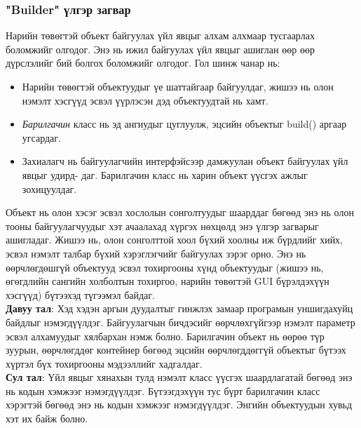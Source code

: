 \subsubsection{"Builder" үлгэр загвар}
\quad \quad Нарийн төвөгтэй объект байгуулах үйл явцыг алхам алхмаар тусгаарлах боломжийг олгодог. Энэ нь ижил байгуулах үйл явцыг ашиглан өөр өөр дүрслэлийг бий болгох боломжийг олгодог. Гол шинж чанар нь:
\begin{itemize}
	\item Нарийн төвөгтэй объектуудыг үе шаттайгаар байгуулдаг, жишээ нь олон нэмэлт хэсгүүд эсвэл үүрлэсэн дэд объектуудтай нь хамт.
	\item \textit{Барилгачин} класс нь эд ангиудыг цуглуулж, эцсийн объектыг build() аргаар угсардаг.
	\item Захиалагч нь байгуулагчийн интерфэйсээр дамжуулан объект байгуулах үйл явцыг удирд- даг. Барилгачин класс нь харин объект үүсгэх ажлыг зохицуулдаг.
\end{itemize}
Объект нь олон хэсэг эсвэл хослолын сонголтуудыг шаарддаг бөгөөд энэ нь олон тооны байгуулагчуудыг хэт ачаалахад хүргэх нөхцөлд энэ үлгэр загварыг ашигладаг. Жишээ нь, олон сонголттой хоол бүхий хоолны иж бүрдлийг хийх, эсвэл нэмэлт талбар бүхий хэрэглэгчийг байгуулах зэрэг орно. Энэ нь өөрчлөгдөшгүй объектууд эсвэл тохиргооны хүнд объектуудыг (жишээ нь, өгөгдлийн сангийн холболтын тохиргоо, нарийн төвөгтэй GUI бүрэлдэхүүн хэсгүүд) бүтээхэд түгээмэл байдаг.\\
\textbf{Давуу тал}: Хэд хэдэн аргын дуудалтыг гинжлэх замаар програмын уншигдахуйц байдлыг нэмэгдүүлдэг. Байгуулагчын бичдэсийг өөрчлөхгүйгээр нэмэлт параметр эсвэл алхамуудыг хялбархан нэмж болно. Барилгачин объект нь өөрөө түр зуурын, өөрчлөгддөг контейнер бөгөөд эцсийн өөрчлөгддөггүй объектыг бүтээх хүртэл бүх тохиргооны мэдээллийг хадгалдаг.\\
\textbf{Сул тал}: Үйл явцыг хянахын тулд нэмэлт класс үүсгэх шаардлагатай бөгөөд энэ нь кодын хэмжээг нэмэгдүүлдэг.	Бүтээгдэхүүн тус бүрт барилгачин класс хэрэгтэй бөгөөд энэ нь кодын хэмжээг нэмэгдүүлдэг. Энгийн объектуудын хувьд хэт их байж болно.

